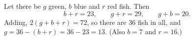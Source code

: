 Let there be $g$ green, $b$ blue and $r$ red fish. Then
\[b+r=23,\qquad g+r=29,\qquad g+b=20.\]
Adding, $2(g+b+r)=72$, so there are $36$ fish in all, and $g=36-(b+r)=36-23=\boxed{13}$. (Also $b=7$ and $r=16$.)
